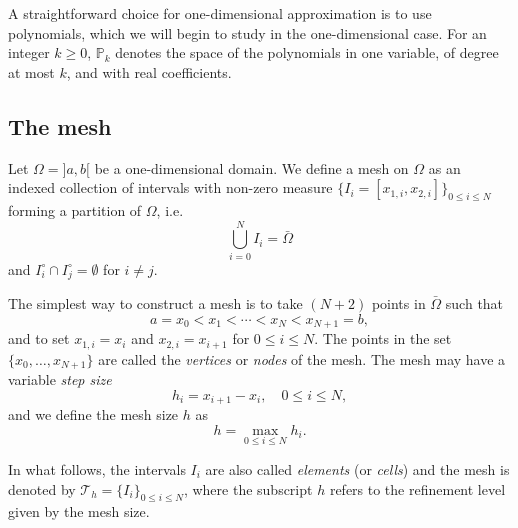 A straightforward choice for one-dimensional approximation is to use polynomials, which we will begin to study in the one-dimensional case. For an integer $k \ge 0$, $\mathbb{P}_k$ denotes the space of the polynomials in one variable, of degree at most $k$, and with real coefficients.

\subsection{The mesh}
\begin{definition}[Mesh]\label{def:mesh}
    Let $\Omega = ]a, b[$ be a one-dimensional domain. We define a mesh on $\Omega$ as an indexed collection of intervals with non-zero measure $\{I_i = [x_{1,i}, x_{2,i}]\}_{0 \leq i \leq N}$ forming a partition of $\Omega$, i.e.
    \begin{equation}\label{eq:def-mesh}
        \bigcup_{i=0}^N I_i = \bar{\Omega}
    \end{equation}
    and $I_i^\circ \cap I_j^\circ = \emptyset$ for $i \neq j$.
\end{definition}
The simplest way to construct a mesh is to take $(N+2)$ points in $\bar{\Omega}$ such that
\begin{equation}
    a = x_0 < x_1 < \cdots < x_N < x_{N+1} = b,
\end{equation}
and to set $x_{1,i} = x_i$ and $x_{2,i} = x_{i+1}$ for $0 \le i \le N$. The points in the set $\{x_0, \dots, x_{N+1}\}$ are called the \emph{vertices} or \emph{nodes} of the mesh. The mesh may have a variable \emph{step size}
\begin{equation}
    h_i = x_{i+1} - x_i, \quad 0 \leq i \le N,
\end{equation}
and we define the mesh size $h$ as
\begin{equation}
    h = \max_{0 \le i \le N} h_i.
\end{equation}

In what follows, the intervals $I_i$ are also called \emph{elements} (or \emph{cells}) and the mesh is denoted by $\mathcal{T}_h = \{I_i\}_{0 \le i \le N}$, where the subscript $h$ refers to the refinement level given by the mesh size.

